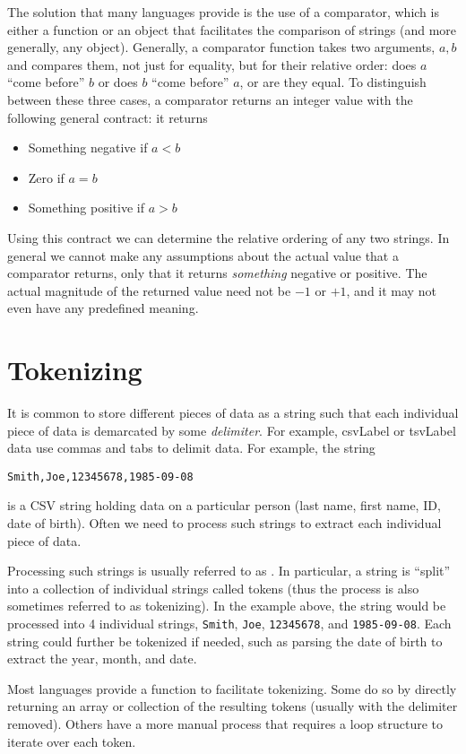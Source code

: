 The solution that many languages provide is the use of a 
\gls{comparator}, which is either a function or an object that
facilitates the comparison of strings (and more generally, any object).
Generally, a comparator function takes two arguments, $a, b$
and compares them, not just for equality, but for their relative
order: does $a$ ``come before'' $b$ or does $b$ ``come before''
$a$, or are they equal.  To distinguish between these three
cases, a comparator returns an integer value with the following
general contract: it returns
\begin{itemize}
  \item Something negative if $a < b$
  \item Zero if $a = b$
  \item Something positive if $a > b$
\end{itemize}
Using this contract we can determine the relative ordering of
any two strings.  In general we cannot make any assumptions
about the actual value that a comparator returns, only that it
returns \emph{something} negative or positive.  The actual
magnitude of the returned value need not be $-1$ or $+1$, 
and it may not even have any predefined meaning.

\section{Tokenizing}

It is common to store different pieces of data as a string such
that each individual piece of data is demarcated by some 
\emph{delimiter}.  For example, \gls{csvLabel} or \gls{tsvLabel}
data use commas and tabs to delimit data.  For example, the
string 

\texttt{Smith,Joe,12345678,1985-09-08}

is a CSV string holding data on a particular person (last name, 
first name, ID, date of birth).  Often we need to process such
strings to extract each individual piece of data.

Processing such strings is usually referred to as .
In particular, a string is ``split'' into a collection of individual
strings called \glspl{token} (thus the process is also sometimes
referred to as tokenizing).  In the example above, the
string would be processed into 4 individual strings, 
\texttt{Smith}, \texttt{Joe}, \texttt{12345678},
and \texttt{1985-09-08}.  Each string could further
be tokenized if needed, such as parsing the date of birth
to extract the year, month, and date.

Most languages provide a function to facilitate tokenizing.  Some
do so by directly returning an array or collection of the resulting
tokens (usually with the delimiter removed).  Others have a
more manual process that requires a loop structure to iterate
over each token.
